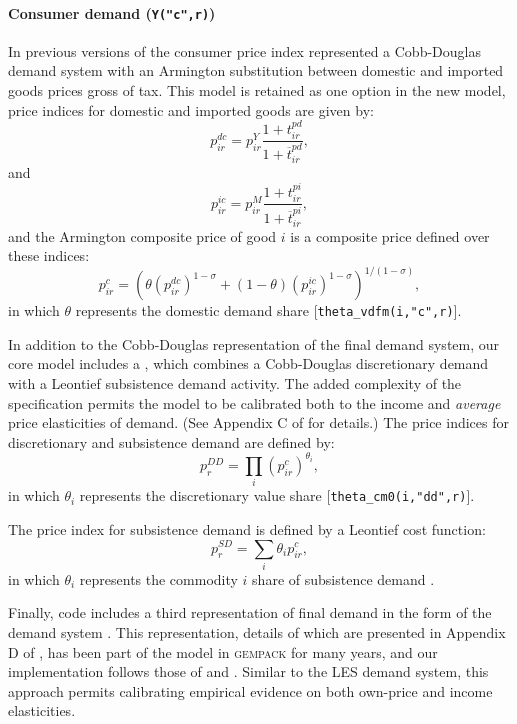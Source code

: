\paragraph{\bf Consumer demand (\texttt{Y("c",r)})}

In previous versions of \GTAPINGAMS the consumer price index represented a Cobb-Douglas demand system with an Armington substitution between domestic and imported goods prices gross of tax.
This model is retained as one option in the new model, price indices for domestic and imported goods are given by:
$$p^{dc}_{ir} = p^Y_{ir} \frac{1+t^{pd}_{ir}}{1+\overline{t}^{pd}_{ir}},$$
and
$$p^{ic}_{ir} = p^M_{ir} \frac{1+t^{pi}_{ir}}{1+\overline{t}^{pi}_{ir}},$$
and the Armington composite price of good $i$ is a \CES composite price defined over these indices:
$$p^c_{ir} = \left(\theta (p^{dc}_{ir})^{1-\sigma} +
                (1-\theta) (p^{ic}_{ir})^{1-\sigma} \right)^{1/(1-\sigma)},$$ in which $\theta$ represents the domestic demand share [{\small \texttt{theta\_vdfm(i,"c",r)}}].

In addition to the Cobb-Douglas representation of the final demand system, our core model includes a \LES, which combines a Cobb-Douglas discretionary demand with a Leontief subsistence demand activity.
The added complexity of the \LES specification permits the model to be calibrated both to the income and \textit{average} price elasticities of demand.
(See Appendix C of \citet{LanzRutherford2016} for details.)
The price indices for discretionary and subsistence demand are defined by:
\begin{equation}
p^{DD}_r = \prod_i (p^c_{ir})^{\theta_i},
\end{equation}
in which $\theta_i$ represents the discretionary value share [{\small \texttt{theta\_cm0(i,"dd",r)}}].

The price index for subsistence demand is defined by a Leontief cost function:
\begin{equation}
p^{SD}_r = \sum_i \theta_i p^c_{ir},
\end{equation}
in which $\theta_i$ represents the commodity $i$ share of subsistence demand \hfill {}.

Finally, \GAMS code includes a third representation of final demand in the form of the \CDE demand system \citep{Hanoch1975}.
This representation, details of which are presented in Appendix D of \citet{LanzRutherford2016}, has been part of the \GTAP model in \textsc{gempack} for many years, and our implementation follows those of \citet{HertelvanderMensbrugghe2015} and \citet{Chen}.
Similar to the LES demand system, this approach permits calibrating empirical evidence on both own-price and income elasticities.


